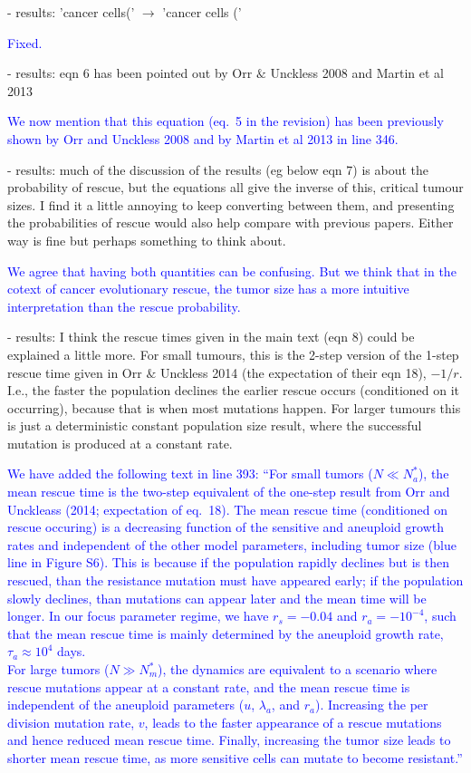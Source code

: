 \documentclass[12pt]{extarticle}
\renewcommand{\Delta}{r}
\begin{document}
- results: 'cancer cells(' $\rightarrow$ 'cancer cells ('

\textcolor{blue}{Fixed.} %

- results: eqn 6 has been pointed out by Orr $\&$ Unckless 2008 and Martin et al 2013

\textcolor{blue}{%
We now mention that this equation (eq.~5 in the revision) has been previously shown by Orr and Unckless 2008 and by Martin et al 2013 in line 346.
} 

- results: much of the discussion of the results (eg below eqn 7) is about the probability of rescue, but the equations all give the inverse of this, critical tumour sizes. I find it a little annoying to keep converting between them, and presenting the probabilities of rescue would also help compare with previous papers. Either way is fine but perhaps something to think about.

\textcolor{blue}{
We agree that having both quantities can be confusing. But we think that in the cotext of cancer evolutionary rescue, the tumor size has a more intuitive interpretation than the rescue probability.
}

- results: I think the rescue times given in the main text (eqn 8) could be explained a little more. For small tumours, this is the 2-step version of the 1-step rescue time given in Orr $\&$ Unckless 2014 (the expectation of their eqn 18), $-1/r$. I.e., the faster the population declines the earlier rescue occurs (conditioned on it occurring), because that is when most mutations happen. For larger tumours this is just a deterministic constant population size result, where the successful mutation is produced at a constant rate.

\textcolor{blue}{%
We have added the following text in line 393: ``For small tumors ($ N \ll N_a^*$), the mean rescue time is the two-step equivalent of the one-step result from Orr and Unckleass (2014; expectation of eq.~18). The mean rescue time (conditioned on rescue occuring) is a decreasing function of the sensitive and aneuploid growth rates and independent of the other model parameters, including tumor size (blue line in Figure S6). This is because if the population rapidly declines but is then rescued, than the resistance mutation must have appeared early; if the population slowly declines, than mutations can appear later and the mean time will be longer. In our focus parameter regime, we have $\Delta_s=-0.04$ and $\Delta_a=-10^{-4}$, such that the mean rescue time is mainly determined by the aneuploid growth rate, $\tau_a \approx 10^4$ days. 
\\
For large tumors ($N \gg N_m^*$), the dynamics are equivalent to a scenario where rescue mutations appear at a constant rate, and the mean rescue time is independent of the aneuploid parameters ($u$, $\lambda_a$, and $\Delta_a$). Increasing the per division mutation rate, $v$, leads to the faster appearance of a rescue mutations and hence reduced mean rescue time. Finally, increasing the tumor size leads to shorter mean rescue time, as more sensitive cells can mutate to become resistant.''
}
\end{document}
